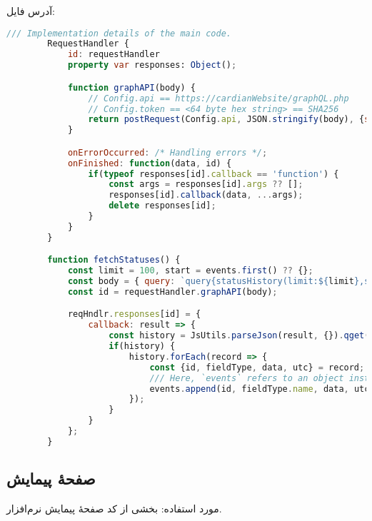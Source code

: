 آدرس فایل:
\hyperref{https://github.com/cardianco/cardian/blob/master/cardian/globals/Status.qml}{}{}{}
\begin{latin}
	\small
	\begin{lstlisting}[language=qml, caption={Global Status Component}]
		/// Implementation details of the main code.
  		RequestHandler {
			id: requestHandler
			property var responses: Object();

			function graphAPI(body) {
				// Config.api == https://cardianWebsite/graphQL.php
				// Config.token == <64 byte hex string> == SHA256
				return postRequest(Config.api, JSON.stringify(body), {stoken: Config.token})
			}

			onErrorOccurred: /* Handling errors */;
			onFinished: function(data, id) {
				if(typeof responses[id].callback == 'function') {
					const args = responses[id].args ?? [];
					responses[id].callback(data, ...args);
					delete responses[id];
				}
			}
		}

		function fetchStatuses() {
			const limit = 100, start = events.first() ?? {};
			const body = { query: `query{statusHistory(limit:${limit},start:${start.id ?? -1}){id fieldType{id name} data utc}}` };
			const id = requestHandler.graphAPI(body);

			reqHndlr.responses[id] = {
				callback: result => {
					const history = JsUtils.parseJson(result, {}).qget('data.statusHistory', []);
					if(history) {
						history.forEach(record => {
							const {id, fieldType, data, utc} = record;
							/// Here, `events` refers to an object instance of `EventModel`.
							events.append(id, fieldType.name, data, utc, fieldType.id);
						});
					}
				}
			};
		}
	\end{lstlisting}
\end{latin}


\subsection{صفحهٔ پیمایش}
مورد استفاده: بخشی از کد صفحهٔ‌ پیمایش نرم‌افزار.


